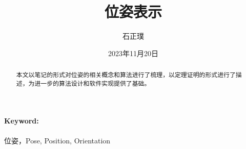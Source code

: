 \documentclass[UTF8,a4paper,10pt]{ctexart}
\title{
  \textbf{位姿表示}
}
\author{石正璞
}
\date{
  2023年11月20日
}
\begin{document}
\maketitle	

\begin{abstract}
本文以笔记的形式对位姿的相关概念和算法进行了梳理，以定理证明的形式进行了描述，为进一步的算法设计和软件实现提供了基础。
\end{abstract}

\paragraph{Keyword:}位姿，Pose, Position, Orientation



\end{document}
